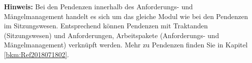 \textbf{Hinweis:} Bei den Pendenzen innerhalb des Anforderungs- und Mängelmanagement handelt es sich um das gleiche Modul wie bei den Pendenzen im Sitzungswesen. Entsprechend können Pendenzen mit Traktanden (Sitzungswesen) und Anforderungen, Arbeitspakete (Anforderungs- und Mängelmanagement) verknüpft werden. Mehr zu Pendenzen finden Sie in Kapitel \ref{bkm:Ref2018071802}.







